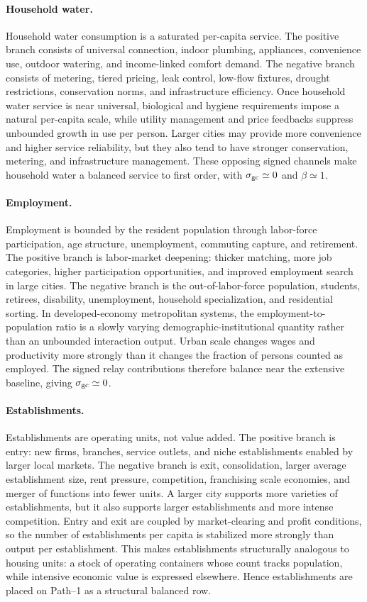 \paragraph{Household water.}
Household water consumption is a saturated per-capita service. The positive branch consists of universal connection, indoor plumbing, appliances, convenience use, outdoor watering, and income-linked comfort demand. The negative branch consists of metering, tiered pricing, leak control, low-flow fixtures, drought restrictions, conservation norms, and infrastructure efficiency. Once household water service is near universal, biological and hygiene requirements impose a natural per-capita scale, while utility management and price feedbacks suppress unbounded growth in use per person. Larger cities may provide more convenience and higher service reliability, but they also tend to have stronger conservation, metering, and infrastructure management. These opposing signed channels make household water a balanced service to first order, with \(\sigma_{\rm gc}\simeq 0\) and \(\beta\simeq 1\).

\paragraph{Employment.}
Employment is bounded by the resident population through labor-force participation, age structure, unemployment, commuting capture, and retirement. The positive branch is labor-market deepening: thicker matching, more job categories, higher participation opportunities, and improved employment search in large cities. The negative branch is the out-of-labor-force population, students, retirees, disability, unemployment, household specialization, and residential sorting. In developed-economy metropolitan systems, the employment-to-population ratio is a slowly varying demographic-institutional quantity rather than an unbounded interaction output. Urban scale changes wages and productivity more strongly than it changes the fraction of persons counted as employed. The signed relay contributions therefore balance near the extensive baseline, giving \(\sigma_{\rm gc}\simeq 0\).

\paragraph{Establishments.}
Establishments are operating units, not value added. The positive branch is entry: new firms, branches, service outlets, and niche establishments enabled by larger local markets. The negative branch is exit, consolidation, larger average establishment size, rent pressure, competition, franchising scale economies, and merger of functions into fewer units. A larger city supports more varieties of establishments, but it also supports larger establishments and more intense competition. Entry and exit are coupled by market-clearing and profit conditions, so the number of establishments per capita is stabilized more strongly than output per establishment. This makes establishments structurally analogous to housing units: a stock of operating containers whose count tracks population, while intensive economic value is expressed elsewhere. Hence establishments are placed on Path--1 as a structural balanced row.

